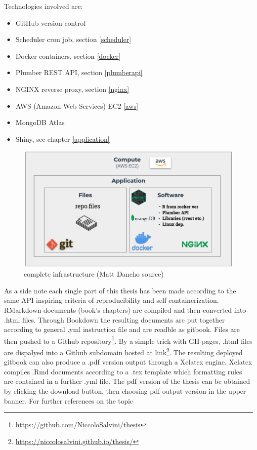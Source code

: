 \documentclass[
  12pt,
  a4paper,
  oneside]{book}
\DeclareRobustCommand{\href}[2]{#2\footnote{\url{#1}}}
\providecommand{\tightlist}{%
  \setlength{\itemsep}{0pt}\setlength{\parskip}{0pt}}
\theoremstyle{definition}
\theoremstyle{definition}
\theoremstyle{definition}
\theoremstyle{remark}
\begin{document}
Technologies involved are:

\begin{itemize}
\tightlist
\item
  GitHub version control
\item
  Scheduler cron job, section \ref{scheduler}
\item
  Docker containers, section \ref{docker}
\item
  Plumber REST API, section \ref{plumberapi}
\item
  NGINX reverse proxy, section \ref{nginx}
\item
  AWS (Amazon Web Services) EC2 \ref{aws}
\item
  MongoDB Atlas
\item
  Shiny, see chapter \ref{application}
\end{itemize}

\begin{figure}
\centering
\includegraphics{images/prova.PNG}
\caption{complete infrastructure (Matt Dancho source)}
\end{figure}

As a side note each single part of this thesis has been made according to the same API inspiring criteria of reproducibility and self containerization. RMarkdown \citep{rmarkdown1} documents (book's chapters) are compiled and then converted into .html files. Through Bookdown \citep{bookdown2} the resulting documents are put together according to general .yml instruction file and are readble as gitbook.
Files are then pushed to a \href{https://github.com/NiccoloSalvini/thesis}{Github repository}. By a simple trick with GH pages, .html files are dispalyed into a Github subdomain hosted at \href{https://niccolosalvini.github.io/thesis/}{link}. The resulting deployed gitbook can also produce a .pdf version output through a Xelatex engine. Xelatex compiles .Rmd documents according to a .tex template which formatting rules are contained in a further .yml file. The pdf version of the thesis can be obtained by clicking the download button, then choosing pdf output version in the upper banner. For further references on the topic \citet{bookdown2}
\end{document}

